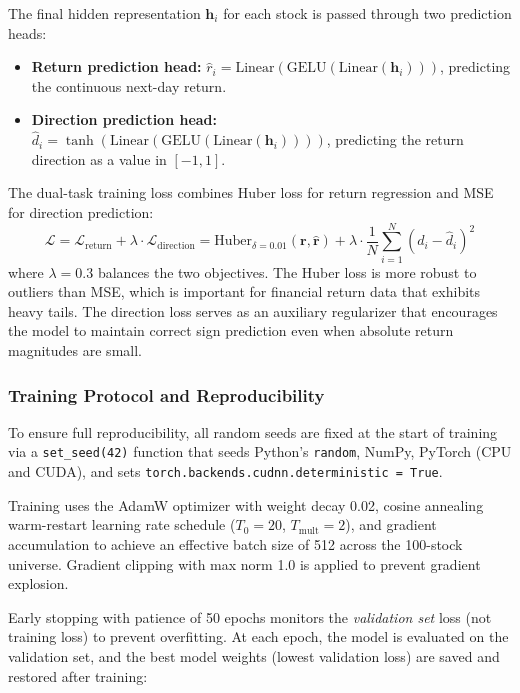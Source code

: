 \documentclass[12pt, a4paper]{article}
\begin{document}
The final hidden representation $\mathbf{h}_i$ for each stock is passed through two prediction heads:

\begin{itemize}[leftmargin=2em]
    \item \textbf{Return prediction head:} $\hat{r}_i = \text{Linear}(\text{GELU}(\text{Linear}(\mathbf{h}_i)))$, predicting the continuous next-day return.
    \item \textbf{Direction prediction head:} $\hat{d}_i = \tanh(\text{Linear}(\text{GELU}(\text{Linear}(\mathbf{h}_i))))$, predicting the return direction as a value in $[-1, 1]$.
\end{itemize}

The dual-task training loss combines Huber loss for return regression and MSE for direction prediction:
\begin{equation} \label{eq:loss}
\mathcal{L} = \mathcal{L}_{\text{return}} + \lambda \cdot \mathcal{L}_{\text{direction}} = \text{Huber}_{\delta=0.01}(\mathbf{r}, \hat{\mathbf{r}}) + \lambda \cdot \frac{1}{N}\sum_{i=1}^{N}(d_i - \hat{d}_i)^2
\end{equation}
where $\lambda = 0.3$ balances the two objectives. The Huber loss is more robust to outliers than MSE, which is important for financial return data that exhibits heavy tails. The direction loss serves as an auxiliary regularizer that encourages the model to maintain correct sign prediction even when absolute return magnitudes are small.

\subsubsection{Training Protocol and Reproducibility}

To ensure full reproducibility, all random seeds are fixed at the start of training via a \texttt{set\_seed(42)} function that seeds Python's \texttt{random}, NumPy, PyTorch (CPU and CUDA), and sets \texttt{torch.backends.cudnn.deterministic = True}.

Training uses the AdamW optimizer with weight decay 0.02, cosine annealing warm-restart learning rate schedule ($T_0 = 20$, $T_{\text{mult}} = 2$), and gradient accumulation to achieve an effective batch size of 512 across the 100-stock universe. Gradient clipping with max norm 1.0 is applied to prevent gradient explosion.

Early stopping with patience of 50 epochs monitors the \emph{validation set} loss (not training loss) to prevent overfitting. At each epoch, the model is evaluated on the validation set, and the best model weights (lowest validation loss) are saved and restored after training:
\end{document}
